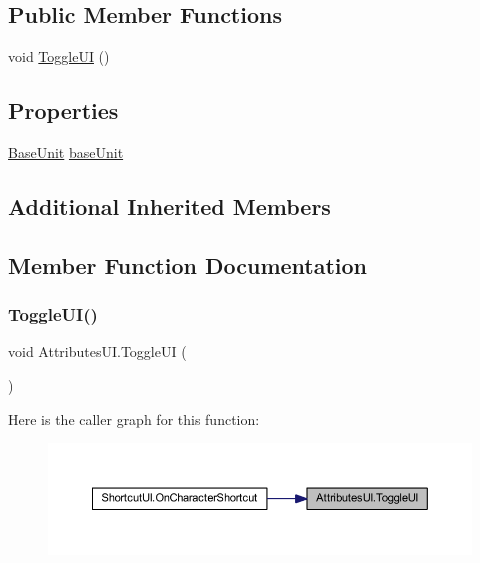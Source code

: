 \subsection*{Public Member Functions}
\begin{DoxyCompactItemize}
\item 
void \mbox{\hyperlink{class_attributes_u_i_a7cb7b0cebe1130576d6bbd279cb62ac1}{Toggle\+UI}} ()
\end{DoxyCompactItemize}
\subsection*{Properties}
\begin{DoxyCompactItemize}
\item 
\mbox{\hyperlink{class_base_unit}{Base\+Unit}} \mbox{\hyperlink{class_attributes_u_i_a346e8b850f9b6c18b78fc7175d89bea7}{base\+Unit}}
\end{DoxyCompactItemize}
\subsection*{Additional Inherited Members}


\subsection{Member Function Documentation}
\mbox{\label{class_attributes_u_i_a7cb7b0cebe1130576d6bbd279cb62ac1}} 
\subsubsection{\texorpdfstring{ToggleUI()}{ToggleUI()}}
{\footnotesize\ttfamily void Attributes\+U\+I.\+Toggle\+UI (\begin{DoxyParamCaption}{ }\end{DoxyParamCaption})}

Here is the caller graph for this function\+:\nopagebreak
\begin{figure}[H]
\begin{center}
\leavevmode
\includegraphics[width=350pt]{class_attributes_u_i_a7cb7b0cebe1130576d6bbd279cb62ac1_icgraph}
\end{center}
\end{figure}


